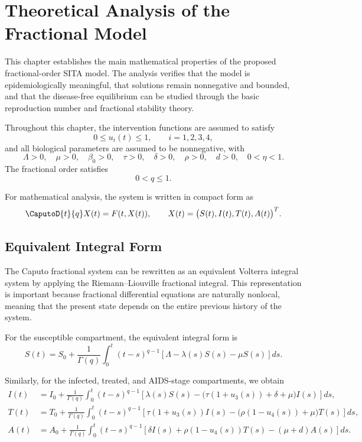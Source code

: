 \chapter{Theoretical Analysis of the Fractional Model}

\begin{remarkbox}[title={Purpose of this chapter}]
This chapter establishes the main mathematical properties of the proposed fractional-order SITA model. The analysis verifies that the model is epidemiologically meaningful, that solutions remain nonnegative and bounded, and that the disease-free equilibrium can be studied through the basic reproduction number and fractional stability theory.
\end{remarkbox}

Throughout this chapter, the intervention functions are assumed to satisfy
\[
0\leq u_i(t)\leq 1,\qquad i=1,2,3,4,
\]
and all biological parameters are assumed to be nonnegative, with
\[
\Lambda>0,\quad \mu>0,\quad \beta_0>0,\quad \tau>0,\quad \delta>0,\quad \rho>0,\quad d>0,\quad 0<\eta<1.
\]
The fractional order satisfies
\[
0<q\leq 1.
\]

For mathematical analysis, the system is written in compact form as
\[
\CaputoD{t}{q}X(t)=F(t,X(t)),
\qquad
X(t)=\bigl(S(t),I(t),T(t),A(t)\bigr)^T.
\]

\section{Equivalent Integral Form}

The Caputo fractional system can be rewritten as an equivalent Volterra integral system by applying the Riemann--Liouville fractional integral. This representation is important because fractional differential equations are naturally nonlocal, meaning that the present state depends on the entire previous history of the system.

For the susceptible compartment, the equivalent integral form is
\begin{equation}
S(t)=S_0+\frac{1}{\Gamma(q)}
\int_0^t (t-s)^{q-1}
\left[\Lambda-\lambda(s)S(s)-\mu S(s)\right]ds.
\label{eq:int_S}
\end{equation}

Similarly, for the infected, treated, and AIDS-stage compartments, we obtain
\begin{align}
I(t)&=I_0+\frac{1}{\Gamma(q)}
\int_0^t (t-s)^{q-1}
\left[
\lambda(s)S(s)-\bigl(\tau(1+u_3(s))+\delta+\mu\bigr)I(s)
\right]ds,
\label{eq:int_I}\\[4pt]
T(t)&=T_0+\frac{1}{\Gamma(q)}
\int_0^t (t-s)^{q-1}
\left[
\tau(1+u_3(s))I(s)-\bigl(\rho(1-u_4(s))+\mu\bigr)T(s)
\right]ds,
\label{eq:int_T}\\[4pt]
A(t)&=A_0+\frac{1}{\Gamma(q)}
\int_0^t (t-s)^{q-1}
\left[
\delta I(s)+\rho(1-u_4(s))T(s)-(\mu+d)A(s)
\right]ds.
\label{eq:int_A}
\end{align}

